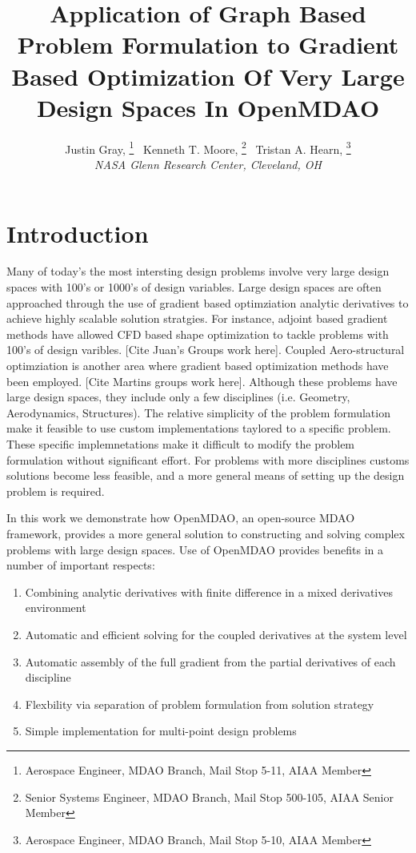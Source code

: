 \documentclass[]{aiaa-tc} %
\title{Application of Graph Based Problem Formulation to Gradient Based Optimization Of Very Large Design Spaces In OpenMDAO}
\author{
  Justin Gray,%
     \thanks{Aerospace Engineer, MDAO Branch, Mail Stop 5-11, AIAA Member}
  \ Kenneth T. Moore,%
     \thanks{Senior Systems Engineer, MDAO Branch, Mail Stop 500-105, AIAA Senior Member}  
   \ Tristan A. Hearn,%
     \thanks{Aerospace Engineer, MDAO Branch, Mail Stop 5-10, AIAA Member}\\
  {\normalsize\itshape
  NASA Glenn Research Center, Cleveland, OH}  \\
 }
\begin{document}
  \maketitle
   
  \begin{abstract}

  \end{abstract}

  \section{Introduction}

    Many of today's the most intersting design problems involve very large design spaces with 100's or 1000's of 
    design variables. Large design spaces are often approached through the use of gradient based optimziation 
    analytic derivatives to achieve highly scalable solution stratgies. For instance, adjoint based gradient 
    methods have allowed CFD based shape optimization to tackle problems with 100's of design varibles. [Cite Juan's Groups
    work here]. Coupled Aero-structural optimziation is another area where gradient based optimization methods have 
    been employed. [Cite Martins groups work here]. Although these problems have large design spaces, 
    they include only a few disciplines (i.e. Geometry, Aerodynamics, Structures). The relative simplicity of 
    the problem formulation make it feasible to use custom implementations taylored to a specific problem. These specific 
    implemnetations make it difficult to modify the problem formulation without significant effort. For problems 
    with more disciplines customs solutions become less feasible, and a more general means of setting up 
    the design problem is required. 

    In this work we demonstrate how OpenMDAO, an open-source MDAO framework, provides a more general 
    solution to constructing and solving complex problems with large design spaces. Use of OpenMDAO 
    provides benefits in a number of important respects: 

    \begin{enumerate}
      \item Combining analytic derivatives with finite difference in a mixed derivatives environment
      \item Automatic and efficient solving for the coupled derivatives at the system level 
      \item Automatic assembly of the full gradient from the partial derivatives of each discipline
      \item Flexbility via separation of problem formulation from solution strategy 
      \item Simple implementation for multi-point design problems
    \end{enumerate}
\end{document}
